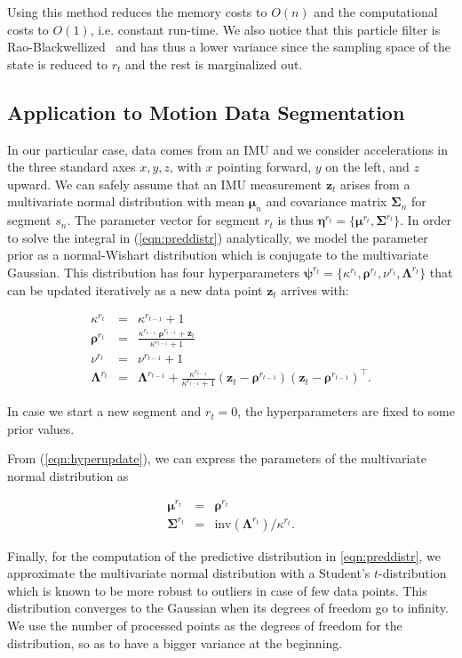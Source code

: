 Using this method reduces the memory costs to $O(n)$ and the computational costs
to $O(1)$, i.e. constant run-time. We also notice that this particle filter is
Rao-Blackwellized~\cite{casella96rao} and has thus a lower variance since the
sampling space of the state is reduced to $r_t$ and the rest is marginalized out.

\subsection{Application to Motion Data Segmentation}
In our particular case, data comes from an IMU and we consider accelerations in
the three standard axes $x,y,z$, with $x$ pointing forward, $y$ on the left, and
$z$ upward. We can safely assume that an IMU measurement $\mathbf{z}_t$ arises
from a multivariate normal distribution with mean $\boldsymbol{\mu}_n$ and
covariance matrix $\boldsymbol{\Sigma}_n$ for segment $s_n$. The parameter
vector for segment $r_t$ is thus $\boldsymbol{\eta}^{r_{t}}=
\{\boldsymbol{\mu}^{r_{t}},\boldsymbol{\Sigma}^{r_{t}}\}$. In order to solve
the integral in (\ref{eqn:preddistr}) analytically, we model the parameter prior
as a normal-Wishart distribution which is conjugate to the multivariate
Gaussian. This distribution has four hyperparameters
$\boldsymbol{\psi}^{r_{t}}=\{\kappa^{r_{t}},\boldsymbol{\rho}^{r_{t}},
\nu^{r_{t}},\boldsymbol{\Lambda}^{r_{t}}\}$ that can be updated iteratively
as a new data point $\mathbf{z}_t$ arrives with:

\begin{eqnarray}
\label{eqn:hyperupdate}
\kappa^{r_{t}}&=&\kappa^{r_{t-1}}+1\nonumber\\
\boldsymbol{\rho}^{r_{t}}&=&\frac{\kappa^{r_{t-1}}\;
\boldsymbol{\rho}^{r_{t-1}}+\mathbf{z}_t}{\kappa^{r_{t-1}}+1}\nonumber\\
\nu^{r_{t}}&=&\nu^{r_{t-1}}+1\nonumber\\
\boldsymbol{\Lambda}^{r_{t}}&=&\boldsymbol{\Lambda}^{r_{t-1}}+
\frac{\kappa^{r_{t-1}}}{\kappa^{r_{t-1}} + 1}
(\mathbf{z}_t - \boldsymbol{\rho}^{r_{t-1}})
(\mathbf{z}_t - \boldsymbol{\rho}^{r_{t-1}})^\intercal.
\end{eqnarray}

In case we start a new segment and $r_t=0$, the hyperparameters are fixed to
some prior values.

From (\ref{eqn:hyperupdate}), we can express the parameters of the
multivariate normal distribution as

\begin{eqnarray}
\label{eqn:ssmvn}
\boldsymbol{\mu}^{r_{t}}&=&\boldsymbol{\rho}^{r_{t}}\nonumber\\
\boldsymbol{\Sigma}^{r_{t}}&=&\text{inv}(\boldsymbol{\Lambda}^{r_{t}})/\kappa^{r_{t}}.
\end{eqnarray}

Finally, for the computation of the predictive distribution in
\eqref{eqn:preddistr}, we approximate the multivariate normal distribution with
a Student's $t$-distribution which is known to be more robust to outliers in
case of few data points. This distribution converges to the Gaussian when its
degrees of freedom go to infinity. We use the number of processed points as the
degrees of freedom for the distribution, so as to have a bigger variance at the
beginning.
